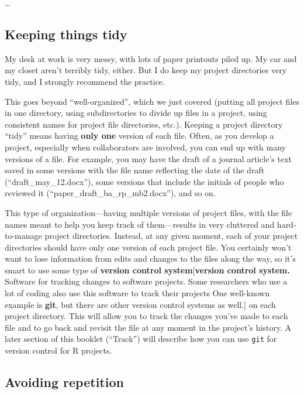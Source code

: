 \documentclass[]{tufte-book}
\begin{document}
\ldots{}

\hypertarget{keeping-things-tidy}{%
\subsection{Keeping things tidy}\label{keeping-things-tidy}}

My desk at work is very messy, with lots of paper printouts piled up. My car and my closet
aren't terribly tidy, either. But I do keep my project directories very tidy, and I
strongly recommend the practice.

This goes beyond ``well-organized'', which we just covered (putting all project
files in one directory, using subdirectories to divide up files in a project,
using consistent names for project file directories, etc.). Keeping a project
directory ``tidy'' means having \textbf{only one} version of each file. Often, as you
develop a project, especially when collaborators are involved, you can end up
with many versions of a file. For example, you may have the draft of a journal
article's text saved in some versions with the file name reflecting the date of
the draft (``draft\_may\_12.docx''), some versions that include the initials of
people who reviewed it (``paper\_draft\_ba\_rp\_mb2.docx''), and so on.

This type of organization---having multiple versions of project files, with the
file names meant to help you keep track of them---results in very cluttered and
hard-to-manage project directories. Instead, at any given moment, each of your
project directories should have only one version of each project file. You
certainly won't want to lose information from edits and changes to the files
along the way, so it's smart to use some type of \textbf{version control
system}{[}\textbf{version control system.} Software for tracking changes to software
projects. Some researchers who use a lot of coding also use this software to
track their projects One well-known example is \textbf{git}, but there are other
version control systems as well.{]} on each project directory. This will allow you
to track the changes you've made to each file and to go back and revisit the
file at any moment in the project's history. A later section of this booklet
(``Track'') will describe how you can use \texttt{git} for version control for R
projects.

\hypertarget{avoiding-repetition}{%
\subsection{Avoiding repetition}\label{avoiding-repetition}}
\end{document}
